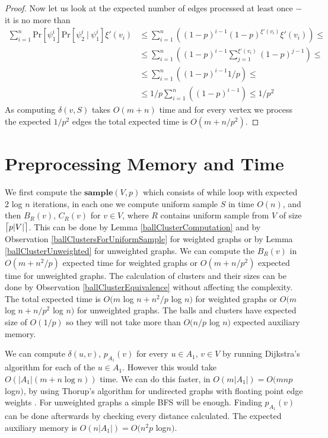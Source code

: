 \documentclass[shortabstract, lic, english]{iithesis}
\theoremstyle{definition} \newtheorem{definition}{Definition}[chapter]
\theoremstyle{plain} \newtheorem{remark}[definition]{Observation}
\theoremstyle{plain} \newtheorem{theorem}[definition]{Theorem}
\theoremstyle{plain} \newtheorem{lemma}[definition]{Lemma}
\theoremstyle{plain} \newtheorem{conjecture}[definition]{Conjecture}
\DeclarePairedDelimiter{\ceil}{\lceil}{\rceil}
\begin{document}
\begin{proof}
    Now let us look at the expected number of edges processed at least once $-$ it is no more than
    \begin{align}
    \sum_{i=1}^{n} \text{Pr}[\psi_1^i]  \text{Pr}[\psi_2^i ~|~ \psi_1^i]  \xi'(v_i) &\leq \sum_{i=1}^{n} ((1-p)^{i-1} (1-p)^{\xi'(v_i)}\xi'(v_i)) \leq \nonumber\\
    &\leq \sum_{i=1}^{n} ((1-p)^{i-1} \sum_{j=1}^{\xi'(v_i)}(1-p)^{j-1}) \leq \nonumber\\
    &\leq \sum_{i=1}^{n} ((1-p)^{i-1}  1/p) \leq \nonumber\\
    &\leq 1/p  \sum_{i=1}^{n} ((1-p)^{i-1}) \leq 1/p^2 \nonumber
    \end{align}
    As computing $\delta(v, S)$ takes $O(m + n)$ time and for every vertex we process the expected $1/p^2$ edges the total expected time is $O(m + n/p^2)$.
\end{proof}


\section{Preprocessing Memory and Time}

We first compute the $\mathbf{sample}(V, p)$ which consists of while loop with expected $2$ log $n$ iterations,
in each one we compute uniform sample $S$ in time $O(n)$, and then $B_R(v)$, $C_R(v)$ for $v \in V$, where $R$ contains uniform sample from $V$ of size $\ceil[\big]{p  |V|}$.
This can be done by Lemma \ref{ballClusterComputation} and by Observation \ref{ballClustersForUniformSample} for weighted graphs or by Lemma \ref{ballClusterUnweighted} for unweighted graphs.
We can compute the $B_R(v)$ in $O(m + n^2/p)$ expected time for weighted graphs or $O(m + n/p^2)$ expected time for unweighted graphs.
The calculation of clusters and their sizes can be done by Observation \ref{ballClusterEquivalence} without affecting the complexity.
The total expected time is $O(m $ log $ n + n^2/p $ log $ n)$ for weighted graphs or $O(m $ log $ n + n/p^2 $ log $ n)$ for unweighted graphs.
The balls and clusters have expected size of $O(1/p)$ so they will not take more than $O(n/p $ log $ n)$ expected auxiliary memory.

We can compute $\delta(u,v)$, $p_{A_1}(v)$ for every $u \in A_1$, $v \in V$ by running Dijkstra's algorithm for each of the $u \in A_1$.
However this would take $O(|A_1| (m + n\log n))$ time.
We can do this faster, in $O(m|A_1|) = O(mnp$ log$ n)$, by using Thorup's algorithm for undirected graphs with floating point edge weights \cite{uberDijkstraInt, uberDijkstraFloat}.
For unweighted graphs a simple BFS will be enough.
Finding $p_{A_1}(v)$ can be done afterwards by checking every distance calculated.
The expected auxiliary memory is $O(n|A_1|) = O(n^2p$ log$ n)$.
\end{document}
